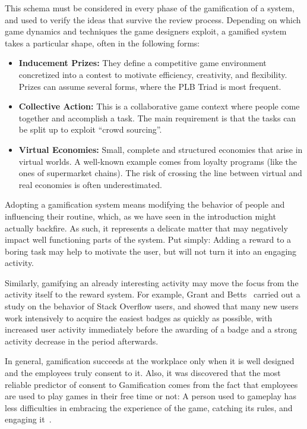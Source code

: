 This schema must be considered in every phase of the gamification of a system, and used to verify the ideas that survive the review process. Depending on which game dynamics and techniques the game designers exploit, a gamified system takes a particular shape, often in the following forms: 
\begin{itemize}
\item \textbf{Inducement Prizes:} They define a competitive game environment concretized into a contest to motivate efficiency, creativity, and flexibility. Prizes can assume several forms, where the PLB Triad is most frequent.
\item \textbf{Collective Action:} This is a collaborative game context where people come together and accomplish a task. The main requirement is that the tasks can be split up to exploit ``crowd sourcing''. 
\item \textbf{Virtual Economies:} Small, complete and structured economies that arise in virtual worlds. A well-known example comes from loyalty programs (like the ones of supermarket chains). The risk of crossing the line between virtual and real economies is often underestimated. 
\end{itemize}

Adopting a gamification system means modifying the behavior of people and influencing their routine, which, as we have seen in the introduction might actually backfire. As such, it represents a delicate matter that may negatively impact well functioning parts of the system. Put simply: Adding a reward to a boring task may help to motivate the user, but will not turn it into an engaging activity.

Similarly, gamifying an already interesting activity may move the focus from the activity itself to the reward system. For example, Grant and Betts~\cite{Grant2013} carried out a study on the behavior of Stack Overflow users, and showed that many new users work intensively to acquire the easiest badges as quickly as possible, with increased user activity  immediately before the awarding of a badge and a strong activity decrease in the period afterwards.

In general, gamification succeeds at the workplace only when it is well designed and the employees truly consent to it. Also, it was discovered that the most reliable predictor of consent to Gamification comes from the fact that employees are used to play games in their free time or not: A person used to gameplay has less difficulties in embracing the experience of the game, catching its rules, and engaging it~\cite{mollick2013mandatory}.

